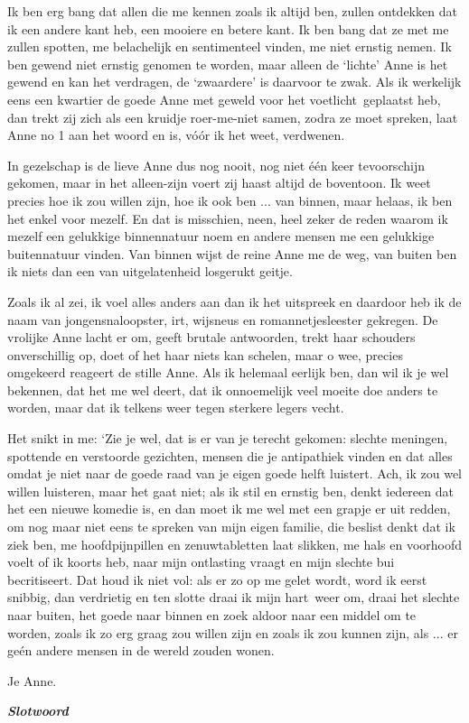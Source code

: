 \documentclass{book}
\begin{document}
Ik ben erg bang dat allen die me kennen zoals ik altijd ben, zullen
ontdekken dat ik een andere kant heb, een mooiere en betere kant. Ik ben
bang dat ze met me zullen spotten, me belachelijk en sentimenteel
vinden, me niet ernstig nemen. Ik ben gewend niet ernstig genomen te
worden, maar alleen de `lichte' Anne is het gewend en kan het verdragen,
de `zwaardere' is daarvoor te zwak. Als ik werkelijk eens een kwartier
de goede Anne met geweld voor het voetlicht~geplaatst heb, dan trekt zij
zich als een kruidje roer-me-niet samen, zodra ze moet spreken, laat
Anne no 1 aan het woord en is, vóór ik het weet, verdwenen.

In gezelschap is de lieve Anne dus nog nooit, nog niet één keer
tevoorschijn gekomen, maar in het alleen-zijn voert zij haast altijd de
boventoon. Ik weet precies hoe ik zou willen zijn, hoe ik ook ben ...
van binnen, maar helaas, ik ben het enkel voor mezelf. En dat is
misschien, neen, heel zeker de reden waarom ik mezelf een gelukkige
binnennatuur noem en andere mensen me een gelukkige buitennatuur vinden.
Van binnen wijst de reine Anne me de weg, van buiten ben ik niets dan
een van uitgelatenheid losgerukt geitje.

Zoals ik al zei, ik voel alles anders aan dan ik het uitspreek en
daardoor heb ik de naam van jongensnaloopster, irt, wijsneus en
romannetjesleester gekregen. De vrolijke Anne lacht er om, geeft brutale
antwoorden, trekt haar schouders onverschillig op, doet of het haar
niets kan schelen, maar o wee, precies omgekeerd reageert de stille
Anne. Als ik helemaal eerlijk ben, dan wil ik je wel bekennen, dat het
me wel deert, dat ik onnoemelijk veel moeite doe anders te worden, maar
dat ik telkens weer tegen sterkere legers vecht.

Het snikt in me: `Zie je wel, dat is er van je terecht gekomen: slechte
meningen, spottende en verstoorde gezichten, mensen die je antipathiek
vinden en dat alles omdat je niet naar de goede raad van je eigen goede
helft luistert. Ach, ik zou wel willen luisteren, maar het gaat niet;
als ik stil en ernstig ben, denkt iedereen dat het een nieuwe komedie
is, en dan moet ik me wel met een grapje er uit redden, om nog maar niet
eens te spreken van mijn eigen familie, die beslist denkt dat ik ziek
ben, me hoofdpijnpillen en zenuwtabletten laat slikken, me hals en
voorhoofd voelt of ik koorts heb, naar mijn ontlasting vraagt en mijn
slechte bui becritiseert. Dat houd ik niet vol: als er zo op me gelet
wordt, word ik eerst snibbig, dan verdrietig en ten slotte draai ik mijn
hart~weer om, draai het slechte naar buiten, het goede naar binnen en
zoek aldoor naar een middel om te worden, zoals ik zo erg graag zou
willen zijn en zoals ik zou kunnen zijn, als ... er geén andere mensen
in de wereld zouden wonen.

Je Anne.

\emph{\textbf{Slotwoord}}
\end{document}
